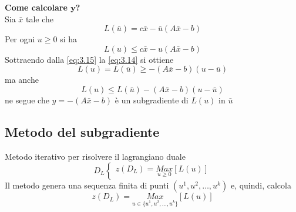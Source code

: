 \textbf{Come calcolare $\boldsymbol{y}$?}\\
Sia $\bar{x}$ tale che
\begin{equation}
	L(\bar{u})=c\bar{x}-\bar{u}(A\bar{x}-b) \label{eq:3.14}
\end{equation}
Per ogni $u\ge 0$ si ha
\begin{equation}
	L(u)\le c\bar{x}-u(A\bar{x}-b) \label{eq:3.15}
\end{equation}
Sottraendo dalla \ref{eq:3.15} la \ref{eq:3.14} si ottiene
\begin{equation*}
	L(u)=L(\bar{u})\ge -(A\bar{x}-b)(u-\bar{u})
\end{equation*}
ma anche
\begin{equation*}
	L(u)\le L(\bar{u})-(A\bar{x}-b)(u-\bar{u})
\end{equation*}
ne segue che $y=-(A\bar{x}-b)$ è un subgradiente di $L(u)$ in $\bar{u}$

\subsection{Metodo del subgradiente}
Metodo iterativo per risolvere il lagrangiano duale
\begin{equation*}
	D_{L}
	\begin{cases}
		z(D_{L})=\underset{u\ge 0}{Max}[L(u)]
	\end{cases}
\end{equation*}
Il metodo genera una sequenza finita di punti $(u^{1},u^{2},\dots,u^{k})$ e, quindi, calcola
\begin{equation*}
	z(D_{L})=\underset{u\in \{u^{1},u^{2},\dots,u^{k}\}}{Max}[L(u)]
\end{equation*}
